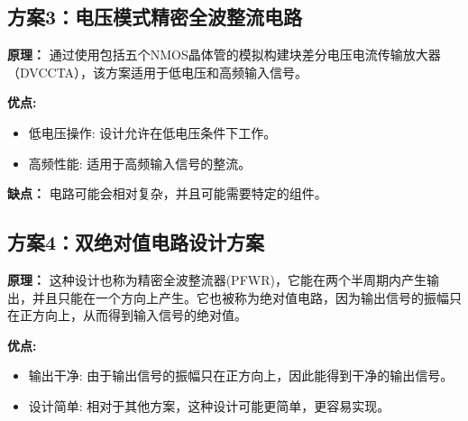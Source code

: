 \documentclass[UTF8,titlepage,a4paper]{ctexart}
\numberwithin{figure}{section}
\begin{document}
\subsection{方案3：电压模式精密全波整流电路}

\textbf{原理：} 通过使用包括五个NMOS晶体管的模拟构建块差分电压电流传输放大器（DVCCTA），该方案适用于低电压和高频输入信号。

\textbf{优点:}
\begin{itemize}
    \item 低电压操作: 设计允许在低电压条件下工作。
    \item 高频性能: 适用于高频输入信号的整流。
\end{itemize}

\textbf{缺点：} 电路可能会相对复杂，并且可能需要特定的组件。
\begin{figure}[H]
\centering
 \caption{}
 \label{}
\end{figure}

\subsection{方案4：双绝对值电路设计方案}

\textbf{原理：} 这种设计也称为精密全波整流器(PFWR)，它能在两个半周期内产生输出，并且只能在一个方向上产生。它也被称为绝对值电路，因为输出信号的振幅只在正方向上，从而得到输入信号的绝对值\cite{electronics_tutorial}。

\textbf{优点:}
\begin{itemize}
    \item 输出干净: 由于输出信号的振幅只在正方向上，因此能得到干净的输出信号。
    \item 设计简单: 相对于其他方案，这种设计可能更简单，更容易实现。
\end{itemize}
\end{document}
